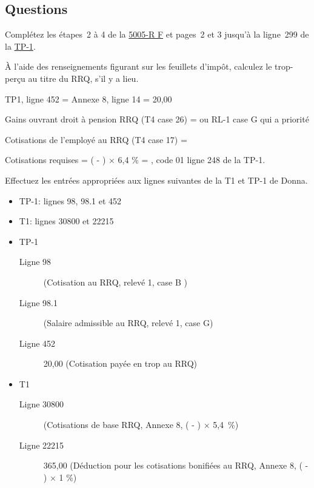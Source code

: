 \subsection{Questions}
Complétez les étapes~2 à 4 de la \href{https://www.canada.ca/fr/agence-revenu/services/formulaires-publications/trousses-impot-toutes-annees-imposition/trousse-generale-impot-prestations/quebec/5005-r.html}{5005-R F} et pages~2 et 3 jusqu'à la ligne~299 de la \href{https://www.revenuquebec.ca/documents/fr/formulaires/tp/2023-12/TP-1.D%282023-12%29.pdf}{TP-1}.

\setcounter{question}{0}
\begin{question}
	À l'aide des renseignements figurant sur les feuillets d'impôt, calculez le trop-perçu au titre du RRQ, s'il y a lieu.
\end{question}
TP1, ligne 452 = Annexe 8, ligne 14 = 20,00

Gains ouvrant droit à pension RRQ (T4 case 26) =  ou RL-1 case G qui a priorité

Cotisations de l’employé au RRQ (T4 case 17) = 

Cotisations requises = ( - ) $\times$ 6,4 \% = , code 01 ligne 248 de la TP-1.

\begin{question}
	Effectuez les entrées appropriées aux lignes suivantes de la T1 et TP-1 de Donna.
	\begin{itemize}
		\item TP-1: lignes 98, 98.1 et 452 
		\item T1: lignes 30800 et 22215
	\end{itemize}
\end{question}
\begin{itemize}
	\item TP-1
	\begin{description}
		\item[Ligne 98]  (Cotisation au RRQ, relevé 1, case B )
		\item[Ligne 98.1]  (Salaire admissible au RRQ, relevé 1, case G)
		\item[Ligne 452] 20,00 (Cotisation payée en trop au RRQ)
	\end{description}
	\item T1
	\begin{description}
		\item[Ligne 30800]  (Cotisations de base RRQ, Annexe 8, ( -  ) $\times$ 5,4~\%)
		\item[Ligne 22215] 365,00 (Déduction pour les cotisations bonifiées au RRQ, Annexe 8, ( -  ) $\times$ 1 \%)
	\end{description}
\end{itemize}

